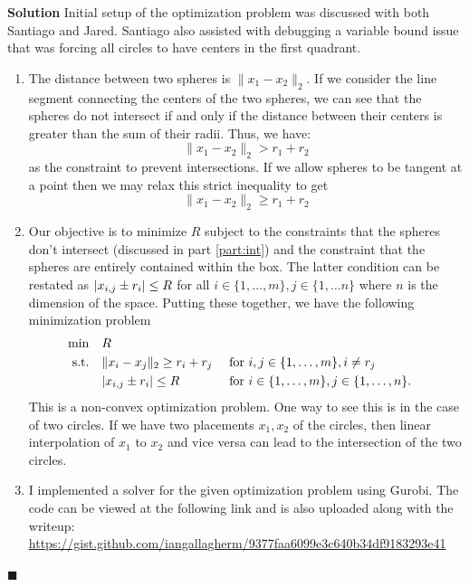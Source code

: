 \documentclass[11pt]{article}
\DeclarePairedDelimiter\abs{\lvert}{\rvert}
\newcommand{\norm}[2]{\lVert #1 \rVert_{#2}}
\theoremstyle{problemstyle}
\newenvironment{solution}
  {\noindent\textbf{Solution}\quad}
  {\hfill$\blacksquare$\par\vspace{1em}}
\begin{document}
\begin{solution}
  \newline
  Initial setup of the optimization problem was discussed with both Santiago and Jared. Santiago also assisted with
  debugging a variable bound issue that was forcing all circles to have centers in the first quadrant.
  \begin{enumerate}
    \item\label{part:int} The distance between two spheres is $\norm{x_1 - x_2}{2}$. If we consider the line segment
      connecting the centers of the two spheres, we can see that the spheres do not intersect if and only if the
      distance between their centers is greater than the sum of their radii. Thus, we have:
      \[
        \norm{x_1 - x_2}{2} > r_1 + r_2
      \]
      as the constraint to prevent intersections. If we allow spheres to be tangent at a point then we may relax this
      strict inequality to get
      \[
        \norm{x_1 - x_2}{2} \geq r_1 + r_2
      \]
    \item Our objective is to minimize $R$ subject to the constraints that the spheres don't intersect (discussed in
      part \ref{part:int}) and the constraint that the spheres are entirely contained within the box. The latter condition
      can be restated as $\abs{x_{i, j} \pm r_i} \leq R$ for all $i \in \{1,\dots,m\}, j \in \{1,\dots n\}$ where $n$ is
      the dimension of the space. Putting these together, we have the following minimization problem
      \begin{equation}
        \begin{aligned}
          \min \quad & R \\
          \textrm{s.t.} \quad &  \norm{x_i - x_j}{2} \geq r_i + r_j && \text{ for } i,j \in \{1,\dots,m\}, i \neq r_j \\
                              & \abs{x_{i,j} \pm r_i} \leq R && \text{ for } i \in \{1,\dots,m\}, j \in \{1,\dots,n\}.
        \end{aligned}
      \end{equation}
      This is a non-convex optimization problem. One way to see this is in the case of two circles. If we have two
      placements $x_1, x_2$ of the circles, then linear interpolation of $x_1$ to $x_2$ and vice versa can lead to the
      intersection of the two circles.
    \newpage
    \item I implemented a solver for the given optimization problem using Gurobi. The code can be viewed at the
      following link and is also uploaded along with the writeup:
      \url{https://gist.github.com/iangallagherm/9377faa6099e3c640b34df9183293e41}
           


\end{enumerate}
\end{solution}
\end{document}
